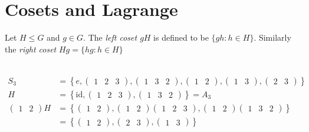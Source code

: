 \hypertarget{cosets-and-lagrange}{%
\section{Cosets and Lagrange}\label{cosets-and-lagrange}}

\begin{definition}[Cosets]
Let $H \leq G$ and $g \in G$.
The \emph{left coset $gH$} is defined to be $\{ gh : h \in H \}$.
Similarly the \emph{right coset} $Hg = \{ hg : h \in H \}$
\end{definition}

\begin{example} ~\vspace*{-1.5\baselineskip}
\begin{align*}
    S_3 &= \left\{ e, \begin{pmatrix}1 & 2 & 3\end{pmatrix}, \begin{pmatrix}1 & 3 & 2\end{pmatrix}, \begin{pmatrix}1 & 2\end{pmatrix}, \begin{pmatrix}1 & 3\end{pmatrix}, \begin{pmatrix}2 & 3\end{pmatrix} \right\} \\
    H &= \left\{ \text{id}, \begin{pmatrix}1 & 2 & 3\end{pmatrix}, \begin{pmatrix}1 & 3 & 2\end{pmatrix} \right\} = A_3 \\
    \begin{pmatrix}1 & 2\end{pmatrix}H &= \left\{ \begin{pmatrix}1 & 2\end{pmatrix}, \begin{pmatrix}1 & 2\end{pmatrix}\begin{pmatrix}1 & 2 & 3\end{pmatrix}, \begin{pmatrix}1 & 2\end{pmatrix}\begin{pmatrix}1 & 3 & 2\end{pmatrix} \right\} \\
    &= \left\{ \begin{pmatrix}1 & 2\end{pmatrix}, \begin{pmatrix}2 & 3\end{pmatrix}, \begin{pmatrix}1 & 3\end{pmatrix} \right\} \\

\end{align*}
\end{example}
